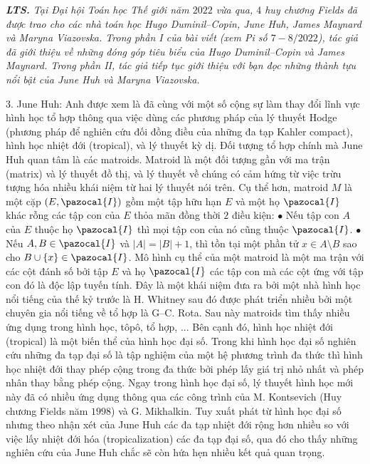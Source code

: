 \textit{\textbf{\color{duongvaotoanhoc}LTS.} Tại Đại hội Toán học Thế giới năm $2022$ vừa qua, $4$ huy chương Fields đã được trao cho các nhà toán học Hugo Duminil--Copin, June Huh, James Maynard và Maryna Viazovska. Trong phần I của bài viết (xem Pi số $7-8/2022$), tác giả đã giới thiệu về những đóng góp tiêu biểu của  Hugo Duminil--Copin và James Maynard. Trong phần II, tác giả tiếp tục giới thiệu với bạn đọc những thành tựu nổi bật của June Huh và Maryna Viazovska.}
\begin{multicols}{2}	
	$3.$ June Huh: Anh được xem là đã cùng với một số cộng sự làm thay đổi lĩnh vực hình học tổ hợp thông qua việc dùng các phương pháp của lý thuyết Hodge (phương pháp để nghiên cứu đối đồng điều của những đa tạp Kahler compact), hình học nhiệt đới (tropical), và lý thuyết kỳ dị. Đối tượng tổ hợp chính mà June Huh quan tâm là các matroids. Matroid là một đối tượng gần với ma trận (matrix) và lý thuyết đồ thị, và lý thuyết về chúng có cảm hứng từ việc trừu tượng hóa nhiều khái niệm từ hai lý thuyết nói trên. Cụ thể hơn, matroid $M$ là một cặp $(E,\pazocal{I})$ gồm một tập hữu hạn $E$ và một họ $\pazocal{I}$ khác rỗng các tập con của $E$ thỏa mãn đồng thời $2$ điều kiện:
	\vskip 0.05cm
	$\bullet$ Nếu tập con $A$ của $E$ thuộc họ $\pazocal{I}$ thì mọi tập con của nó cũng thuộc $\pazocal{I}$.
	\vskip 0.05cm
	$\bullet$ Nếu $A, B \in \pazocal{I}$ và $|A| = |B| +1$, thì tồn tại một phần tử $x \in A \setminus B$ sao cho $B \cup \{x\} \in \pazocal{I}$.
	\vskip 0.05cm
	Mô hình cụ thể của một matroid là một ma trận với các cột đánh số bởi tập $E$ và họ $\pazocal{I}$ các tập con mà các cột ứng với tập con đó là độc lập tuyến tính.
	\vskip 0.05cm
	Đây là một khái niệm đưa ra bởi một nhà hình học nổi tiếng của thế kỷ trước là H. Whitney sau đó được phát triển nhiều bởi một chuyên gia nổi tiếng về tổ hợp là G--C. Rota. Sau này matroids tìm thấy nhiều ứng dụng trong hình học, tôpô, tổ hợp, ...
	\vskip 0.05cm
	Bên cạnh đó, hình học nhiệt đới (tropical) là một biến thể của hình học đại số. Trong khi hình học đại số nghiên cứu những đa tạp đại số là tập nghiệm của một hệ phương trình đa thức thì hình học nhiệt đới thay phép cộng trong đa thức bởi phép lấy giá trị nhỏ nhất và phép nhân thay bằng phép cộng. Ngay trong hình học đại số, lý thuyết hình học mới này đã có nhiều ứng dụng thông qua các công trình của M. Kontsevich (Huy chương Fields năm $1998$) và G. Mikhalkin. Tuy xuất phát từ hình học đại số nhưng theo nhận xét của June Huh các đa tạp nhiệt đới rộng hơn nhiều so với việc lấy nhiệt đới hóa (tropicalization) các đa tạp đại số, qua đó cho thấy những nghiên cứu của June Huh chắc sẽ còn hứa hẹn nhiều kết quả quan trọng.  

\end{multicols}
